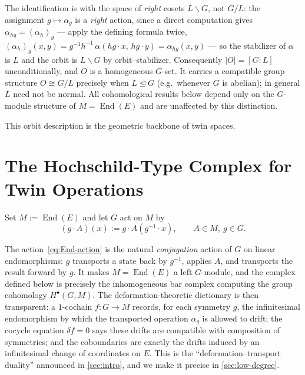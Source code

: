\documentclass[11pt,a4paper]{article}
\numberwithin{equation}{section}
\DeclareMathOperator{\End}{End}
\newcommand{\TwinOrbit}{O}
\newcommand{\LinearSubgroup}{L}
\newcommand{\diff}{\delta}
\newcommand{\abs}[1]{\left\lvert #1 \right\rvert}
\begin{document}
	\begin{remark}\label{rem:right-cosets}
		The identification is with the space of \emph{right} cosets $\LinearSubgroup\backslash G$,
		not $G/\LinearSubgroup$: the assignment $g\mapsto\alpha_g$ is a \emph{right} action, since a
		direct computation gives $\alpha_{hg}=(\alpha_h)_g$ --- apply the defining formula twice, $(\alpha_h)_g(x,y)=g^{-1}h^{-1}\,\alpha(hg\cdot x,\,hg\cdot y)=\alpha_{hg}(x,y)$ --- so the stabilizer of $\alpha$ is
		$\LinearSubgroup$ and the orbit is $\LinearSubgroup\backslash G$ by orbit--stabilizer.
		Consequently $\abs{\TwinOrbit}=[G:\LinearSubgroup]$ unconditionally, and $\TwinOrbit$ is a
		homogeneous $G$-set. It carries a compatible group structure $\TwinOrbit\cong G/\LinearSubgroup$
		precisely when $\LinearSubgroup\trianglelefteq G$ (e.g.\ whenever $G$ is abelian); in general
		$\LinearSubgroup$ need not be normal. All cohomological results below depend only on the
		$G$-module structure of $M=\End(E)$ and are unaffected by this distinction.
	\end{remark}

	This orbit description is the geometric backbone of twin spaces.
	
	\section{The Hochschild-Type Complex for Twin Operations}
	\label{sec:hoch}
	
	Set $M:=\End(E)$ and let $G$ act on $M$ by
	\begin{equation}\label{eq:End-action}
		(g\cdot A)(x) := g\cdot A(g^{-1}\cdot x), \qquad A\in M,\ g\in G.
	\end{equation}
	
	The action~\eqref{eq:End-action} is the natural \emph{conjugation} action of $G$ on linear
	endomorphisms: $g$ transports a state back by $g^{-1}$, applies $A$, and transports the result forward
	by $g$. It makes $M=\End(E)$ a left $G$-module, and the complex defined below is precisely the
	inhomogeneous bar complex computing the group cohomology $H^\bullet(G,M)$. The deformation-theoretic
	dictionary is then transparent: a $1$-cochain $f:G\to M$ records, for each symmetry $g$, the
	infinitesimal endomorphism by which the transported operation $\alpha_g$ is allowed to drift; the
	cocycle equation $\diff f=0$ says these drifts are compatible with composition of symmetries; and the
	coboundaries are exactly the drifts induced by an infinitesimal change of coordinates on $E$. This is
	the ``deformation--transport duality'' announced in \cref{sec:intro}, and we make it precise in
	\cref{sec:low-degree}.
\end{document}
